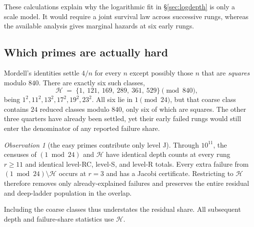 \documentclass[11pt]{article}
\theoremstyle{definition}
\theoremstyle{remark}
\newtheorem{observation}[theorem]{Observation}
\begin{document}
These calculations explain why the logarithmic fit in \S\ref{sec:logdepth} is only a
scale model. It would require a joint survival law across successive rungs, whereas the
available analysis gives marginal hazards at six early rungs.

\iffalse

\subsection{Which primes are actually hard}\label{sec:hardclass}

Mordell's identities \cite{Mordell1969} settle $4/n$ for every $n$ except possibly those
$n$ that are \emph{squares} modulo $840$. There are exactly six such classes,
\begin{equation}\label{eq:hardclass}
\mathcal{H} \;=\; \{1,\ 121,\ 169,\ 289,\ 361,\ 529\} \pmod{840},
\end{equation}
being $1^2, 11^2, 13^2, 17^2, 19^2, 23^2$. All six lie in $1\pmod{24}$, but that coarse
class contains $24$ reduced classes modulo $840$, only six of which are squares. The
other three quarters have already been settled, yet their early failed rungs would
still enter the denominator of any reported failure share.

\begin{observation}[the easy primes contribute only level J]\label{obs:dilution}
Through $10^{11}$, the censuses of $(1\bmod24)$ and $\mathcal{H}$ have identical depth
counts at every rung $r\ge11$ and identical level-RC, level-S, and level-R totals. Every
extra failure from $(1\bmod24)\setminus\mathcal{H}$ occurs at $r=3$ and has a Jacobi
certificate. Restricting to $\mathcal{H}$ therefore removes only already-explained
failures and preserves the entire residual and deep-ladder population in the overlap.
\end{observation}

Including the coarse classes thus understates the residual share. All subsequent depth
and failure-share statistics use $\mathcal{H}$.
\end{document}
